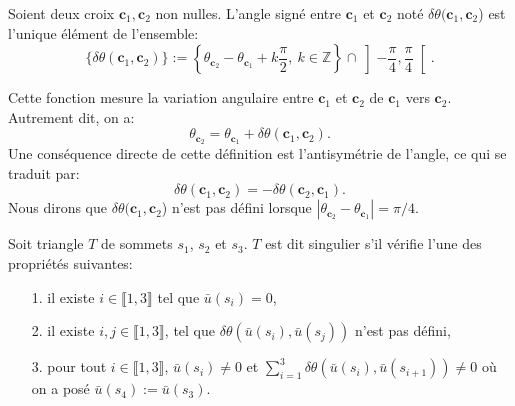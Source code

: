 \begin{definition}
Soient deux croix $\mathbf{c}_1,\mathbf{c}_2$ non nulles. L'angle signé entre $\mathbf{c}_1$ et $\mathbf{c}_2$ noté $\delta\theta(\mathbf{c}_1,\mathbf{c}_2$) est l'unique élément de l'ensemble:
$$
\{\delta\theta(\mathbf{c}_1,\mathbf{c}_2)\}:=\left\{\theta_{\mathbf{c}_2}-\theta_{\mathbf{c}_1}+k\frac{\pi}{2},~k\in\mathbb{Z}\right\}\cap\left]-\frac{\pi}{4}, \frac{\pi}{4}\right[.
$$
\end{definition}
Cette fonction mesure la variation angulaire entre $\mathbf{c}_1$ et $\mathbf{c}_2$ de $\mathbf{c}_1$ vers $\mathbf{c}_2$. Autrement dit, on a:
$$
\theta_{\mathbf{c}_2}=\theta_{\mathbf{c}_1}+\delta\theta(\mathbf{c}_1,\mathbf{c}_2).
$$
Une conséquence directe de cette définition est l'antisymétrie de l'angle, ce qui se traduit par:
$$
\delta\theta(\mathbf{c}_1, \mathbf{c}_2)=-\delta\theta(\mathbf{c}_2,\mathbf{c}_1).
$$
Nous dirons que $\delta\theta(\mathbf{c}_1,\mathbf{c}_2$) n'est pas défini lorsque $|\theta_{\mathbf{c}_2}-\theta_{\mathbf{c}_1}|=\pi/4$.

\begin{definition}
\label{def:triangle_singulier}
 Soit triangle $T$ de sommets $s_1$, $s_2$ et $s_3$. $T$ est dit singulier s'il vérifie l'une des propriétés suivantes:\\
 \begin{itemize}
  \item[1.] il existe $i\in\llbracket 1, 3\rrbracket$ tel que $\bar{u}(s_i)=0$,\\%
  \item[2.] il existe  $i,j\in\llbracket 1, 3\rrbracket$, tel que  $\delta\theta(\bar{u}(s_i),\bar{u}(s_j))$ n'est pas défini,\\%
  \item[3.] pour tout $i\in\llbracket 1, 3\rrbracket$, $\bar{u}(s_i)\neq 0$ et $\sum_{i=1}^3\delta\theta(\bar{u}(s_i),\bar{u}(s_{i+1}))\neq 0$ où on a posé $\bar{u}(s_4):=\bar{u}(s_3)$.\\[-0.2cm]
 \end{itemize}
\end{definition}

